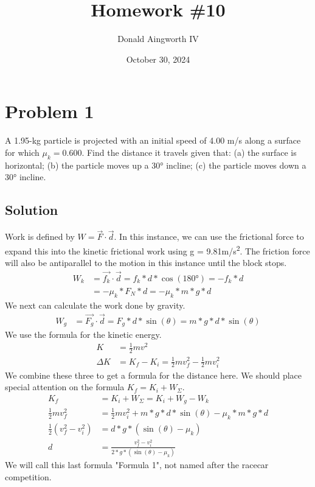 \documentclass[12pt]{article}
\title{Homework \#10}
\author{Donald Aingworth IV}
\date{October 30, 2024}
\begin{document}

\maketitle

\pagebreak
\section*{Problem 1}
A 1.95-kg particle is projected with an initial speed of 4.00 m/s along a surface for which $\mu_k = 0.600$. Find the distance it travels given that: (a) the surface is horizontal; (b) the particle moves up a 30\unit{\degree} incline; (c) the particle moves down a 30\unit{\degree} incline.

\subsection*{Solution}
Work is defined by $ W = \vec{F}\cdot\vec{d} $. In this instance, we can use the frictional force to expand this into the kinetic frictional work using g = 9.81\unit{\meter/\second^2}. The friction force will also be antiparallel to the motion in this instance until the block stops.
\begin{align*}
    W_k &=  \vec{f_k}\cdot\vec{d}
        =   f_k*d*\cos(180\unit{\degree})
        =   -f_k*d\\
        &=  -\mu_k*F_N*d
        =   -\mu_k*m*g*d
\end{align*}
We next can calculate the work done by gravity.
\begin{align*}
    W_g &=  \vec{F_g}\cdot\vec{d}
        =   F_g*d*\sin(\theta)
        =   m*g*d*\sin(\theta)
\end{align*}
We use the formula for the kinetic energy.
\begin{align*}
    K   &=  \frac{1}{2}mv^2\\
    \Delta K    &=  K_f - K_i
                =   \frac{1}{2}mv_f^2 - \frac{1}{2}mv_i^2
\end{align*}
We combine these three to get a formula for the distance here. We should place special attention on the formula $K_f = K_i + W_\Sigma$. 
\begin{align*}
    K_f &=  K_i + W_\Sigma
        =   K_i + W_g - W_k\\
    \frac{1}{2}mv_f^2 &= \frac{1}{2}mv_i^2 + m*g*d*\sin(\theta) - \mu_k*m*g*d\\
    \frac{1}{2}(v_f^2 - v_i^2)  &=  d*g*(\sin(\theta)-\mu_k)\\
    d   &=  \frac{v_f^2 - v_i^2}{2*g*(\sin(\theta)-\mu_k)}
\end{align*}
We will call this last formula  "Formula 1", not named after the racecar competition.
\pagebreak
\end{document}
